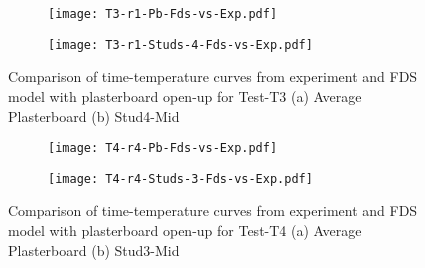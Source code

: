 \begin{figure}[!htbp]
	\centering
	\begin{subfigure}[b]{0.7\textwidth}
		\centering
		\texttt{[image: T3-r1-Pb-Fds-vs-Exp.pdf]}
		\caption{}
		\label{subfig:T3-r1-Pb-Fds-vs-Exp-pbop}
	\end{subfigure}
	\begin{subfigure}[b]{0.6\textwidth}
		\centering
		\texttt{[image: T3-r1-Studs-4-Fds-vs-Exp.pdf]}
		\caption{}
		\label{subfig:T3-r0-Studs-4-Fds-vs-Exp-pbop}
	\end{subfigure}
	   \caption{Comparison of time-temperature curves from experiment and FDS model with plasterboard open-up for Test-T3 (a) Average Plasterboard (b) Stud4-Mid}
	   \label{fig:T3-fds-output-pbop}
\end{figure}
\begin{figure}[!htbp]
	\centering
	\begin{subfigure}[b]{0.7\textwidth}
		\centering
		\texttt{[image: T4-r4-Pb-Fds-vs-Exp.pdf]}
		\caption{}
		\label{subfig:T4-r4-Pb-Fds-vs-Exp-pbop}
	\end{subfigure}
	\begin{subfigure}[b]{0.6\textwidth}
		\centering
		\texttt{[image: T4-r4-Studs-3-Fds-vs-Exp.pdf]}
		\caption{}
		\label{subfig:T4-r4-Studs-3-Fds-vs-Exp-pbop}
	\end{subfigure}
	   \caption{Comparison of time-temperature curves from experiment and FDS model with plasterboard open-up for Test-T4 (a) Average Plasterboard (b) Stud3-Mid}
	   \label{fig:T4-fds-output-pbop}
\end{figure}

